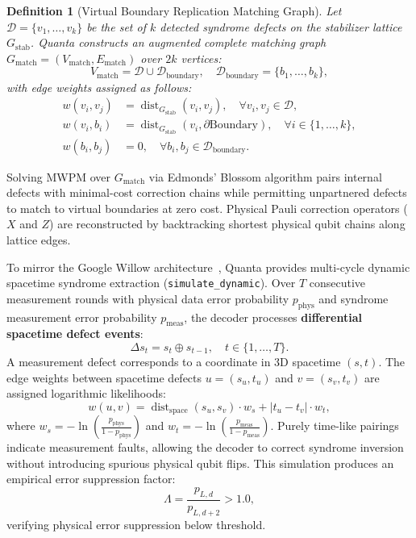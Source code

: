 \documentclass[aps,prx,twocolumn,superscriptaddress,nofootinbib]{revtex4-2}
\newtheorem{definition}{Definition}
\begin{document}
\begin{definition}[Virtual Boundary Replication Matching Graph]
Let $\mathcal{D} = \{v_1, \dots, v_k\}$ be the set of $k$ detected syndrome defects on the stabilizer lattice $G_{\text{stab}}$. Quanta constructs an augmented complete matching graph $G_{\text{match}} = (V_{\text{match}}, E_{\text{match}})$ over $2k$ vertices:
\begin{equation}
    V_{\text{match}} = \mathcal{D} \cup \mathcal{D}_{\text{boundary}}, \quad \mathcal{D}_{\text{boundary}} = \{b_1, \dots, b_k\},
\end{equation}
with edge weights assigned as follows:
\begin{align}
    w(v_i, v_j) &= \operatorname{dist}_{G_{\text{stab}}}(v_i, v_j), \quad \forall v_i, v_j \in \mathcal{D}, \\
    w(v_i, b_i) &= \operatorname{dist}_{G_{\text{stab}}}(v_i, \partial \text{Boundary}), \quad \forall i \in \{1, \dots, k\}, \\
    w(b_i, b_j) &= 0, \quad \forall b_i, b_j \in \mathcal{D}_{\text{boundary}}.
\end{align}
\end{definition}

Solving MWPM over $G_{\text{match}}$ via Edmonds' Blossom algorithm pairs internal defects with minimal-cost correction chains while permitting unpartnered defects to match to virtual boundaries at zero cost. Physical Pauli correction operators ($X$ and $Z$) are reconstructed by backtracking shortest physical qubit chains along lattice edges.

To mirror the Google Willow architecture~\cite{google2024willow}, Quanta provides multi-cycle dynamic spacetime syndrome extraction (\texttt{simulate\_dynamic}). Over $T$ consecutive measurement rounds with physical data error probability $p_{\text{phys}}$ and syndrome measurement error probability $p_{\text{meas}}$, the decoder processes \textbf{differential spacetime defect events}:
\begin{equation}
    \Delta s_t = s_t \oplus s_{t-1}, \quad t \in \{1, \dots, T\}.
\end{equation}
A measurement defect corresponds to a coordinate in 3D spacetime $(s, t)$. The edge weights between spacetime defects $u = (s_u, t_u)$ and $v = (s_v, t_v)$ are assigned logarithmic likelihoods:
\begin{equation}
    w(u, v) = \operatorname{dist}_{\text{space}}(s_u, s_v) \cdot w_s + |t_u - t_v| \cdot w_t,
\end{equation}
where $w_s = -\ln\left(\frac{p_{\text{phys}}}{1 - p_{\text{phys}}}\right)$ and $w_t = -\ln\left(\frac{p_{\text{meas}}}{1 - p_{\text{meas}}}\right)$. Purely time-like pairings indicate measurement faults, allowing the decoder to correct syndrome inversion without introducing spurious physical qubit flips. This simulation produces an empirical error suppression factor:
\begin{equation}
    \Lambda = \frac{p_{L, d}}{p_{L, d+2}} > 1.0,
\end{equation}
verifying physical error suppression below threshold.
\end{document}
